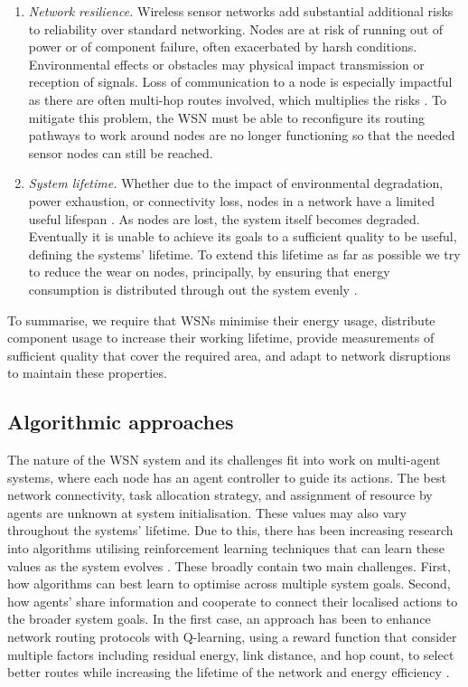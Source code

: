 \begin{enumerate}
\item \label{requirement:resilience} \textit{Network resilience.} Wireless sensor networks add substantial additional risks to reliability over standard networking. Nodes are at risk of running out of power or of component failure, often exacerbated by harsh conditions. Environmental effects or obstacles may physical impact transmission or reception of signals. Loss of communication to a node is especially impactful as there are often multi-hop routes involved, which multiplies the risks \citep{Paradis2007}. To mitigate this problem, the WSN must be able to reconfigure its routing pathways to work around nodes are no longer functioning so that the needed sensor nodes can still be reached.

\item \label{requirement:lifetime} \textit{System lifetime.} Whether due to the impact of environmental degradation, power exhaustion, or connectivity loss, nodes in a network have a limited useful lifespan \citep{Mak2009}. As nodes are lost, the system itself becomes degraded. Eventually it is unable to achieve its goals to a sufficient quality to be useful, defining the systems' lifetime. To extend this lifetime as far as possible we try to reduce the wear on nodes, principally, by ensuring that energy consumption is distributed through out the system evenly \citep{BABAYO20171176, Engmann2018}.
\end{enumerate}
To summarise, we require that WSNs minimise their energy usage, distribute component usage to increase their working lifetime, provide measurements of sufficient quality that cover the required area, and adapt to network disruptions to maintain these properties.

\subsection{Algorithmic approaches}
The nature of the WSN system and its challenges fit into work on multi-agent systems, where each node has an agent controller to guide its actions. The best network connectivity, task allocation strategy, and assignment of resource by agents are unknown at system initialisation. These values may also vary throughout the systems' lifetime. Due to this, there has been increasing research into algorithms utilising reinforcement learning techniques that can learn these values as the system evolves \citep{Al-Rawi2015}. These broadly contain two main challenges. First, how algorithms can best learn to optimise across multiple system goals. Second, how agents' share information and cooperate to connect their localised actions to the broader system goals. In the first case, an approach has been to enhance network routing protocols with Q-learning, using a reward function that consider multiple factors including residual energy, link distance, and hop count, to select better routes while increasing the lifetime of the network and energy efficiency \citep{Guo2019}. 

